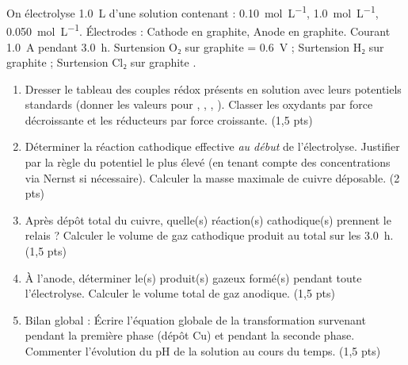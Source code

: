 \documentclass[11pt]{article}
\begin{document}
\begin{exercice}
On électrolyse \SI{1,0}{L} d'une solution contenant :  \SI{0,10}{mol.L^{-1}},  \SI{1,0}{mol.L^{-1}},  \SI{0,050}{mol.L^{-1}}. Électrodes : Cathode en graphite, Anode en graphite. Courant \SI{1,0}{A} pendant \SI{3,0}{h}. Surtension O₂ sur graphite = \SI{0,6}{V} ; Surtension H₂ sur graphite  ; Surtension Cl₂ sur graphite .
\begin{enumerate}
    \item Dresser le tableau des couples rédox présents en solution avec leurs potentiels standards (donner les valeurs pour , , , ). Classer les oxydants par force décroissante et les réducteurs par force croissante. (1,5 pts)
    \item Déterminer la réaction cathodique effective \textit{au début} de l'électrolyse. Justifier par la règle du potentiel le plus élevé (en tenant compte des concentrations via Nernst si nécessaire). Calculer la masse maximale de cuivre déposable. (2 pts)
    \item Après dépôt total du cuivre, quelle(s) réaction(s) cathodique(s) prennent le relais ? Calculer le volume de gaz cathodique produit au total sur les \SI{3,0}{h}. (1,5 pts)
    \item À l'anode, déterminer le(s) produit(s) gazeux formé(s) pendant toute l'électrolyse. Calculer le volume total de gaz anodique. (1,5 pts)
    \item Bilan global : Écrire l'équation globale de la transformation survenant pendant la première phase (dépôt Cu) et pendant la seconde phase. Commenter l'évolution du pH de la solution au cours du temps. (1,5 pts)
\end{enumerate}
\end{exercice}
\end{document}
